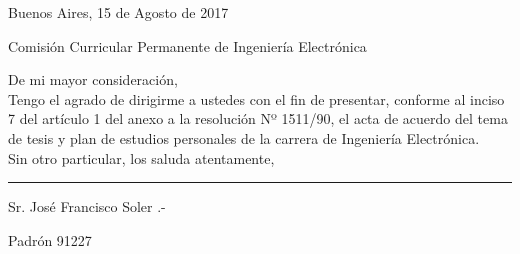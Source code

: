 \hfill Buenos Aires, 15 de Agosto de 2017

\noindent Comisión Curricular Permanente de Ingeniería Electrónica

\noindent De mi mayor consideración,
\\

Tengo el agrado de dirigirme a ustedes con el fin de presentar, conforme al inciso 7 del artículo 1 del anexo a la resolución Nº 1511/90, el acta de acuerdo del tema de tesis y plan de estudios personales de la carrera de Ingeniería Electrónica.
\\

Sin otro particular, los saluda atentamente,

\vspace*{3cm}
\noindent\rule{5cm}{0.4pt}

\noindent Sr. José Francisco Soler .-

\noindent Padrón 91227

